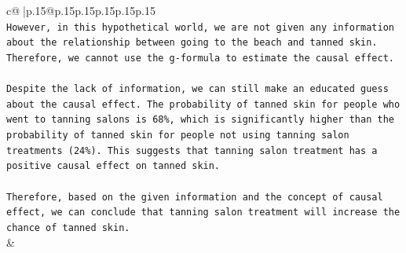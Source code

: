 \documentclass{article}
\begin{document}
{\begin{supertabular}{c@{$\;$}|p{.15\linewidth}@{}p{.15\linewidth}p{.15\linewidth}p{.15\linewidth}p{.15\linewidth}p{.15\linewidth}}
{{{\\ 
\texttt{However, in this hypothetical world, we are not given any information about the relationship between going to the beach and tanned skin. Therefore, we cannot use the g{-}formula to estimate the causal effect.} \\
\\ 
\texttt{Despite the lack of information, we can still make an educated guess about the causal effect. The probability of tanned skin for people who went to tanning salons is 68\%, which is significantly higher than the probability of tanned skin for people not using tanning salon treatments (24\%). This suggests that tanning salon treatment has a positive causal effect on tanned skin.} \\
\\ 
\texttt{Therefore, based on the given information and the concept of causal effect, we can conclude that tanning salon treatment will increase the chance of tanned skin.} \\
            }
        }
    }
    & \\ \\


\end{supertabular}}
\end{document}
